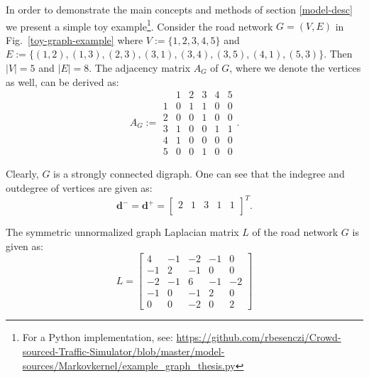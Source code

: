 \documentclass[b5paper,12pt]{report}
\theoremstyle{definition}
\newcommand{\bd}{\boldsymbol{d}}
\begin{document}
In order to demonstrate the main concepts and methods of section \ref{model-desc} we present a simple toy example\footnote{For a Python implementation, see: \url{https://github.com/rbesenczi/Crowd-sourced-Traffic-Simulator/blob/master/model-sources/Markovkernel/example_graph_thesis.py}}. Consider the road network $G=(V,E)$ in Fig.~\ref{toy-graph-example} where $V := \{1, 2, 3, 4, 5\}$ and \\$E := \{(1, 2), (1, 3), (2, 3), (3, 1), (3, 4), (3, 5), (4, 1), (5, 3)\}$. Then $|V| = 5$ and $|E| = 8$. The adjacency matrix $A_G$ of $G$, where we denote the vertices as well, can be derived as:
\[ A_G := \begin{array}{c|ccccc}
 & 1 & 2 & 3 & 4 & 5 \\
 \hline
1 & 0 & 1 & 1 & 0 & 0 \\
2 & 0 & 0 & 1 & 0 & 0 \\
3 & 1 & 0 & 0 & 1 & 1 \\
4 & 1 & 0 & 0 & 0 & 0 \\
5 & 0 & 0 & 1 & 0 & 0
\end{array}.\] 

Clearly, $G$ is a strongly connected digraph. One can see that the indegree and outdegree of vertices are given as:
\[ 
\bd^{−} = \bd^{+} = \left[ \begin{array}{ccccc}
2 & 1 & 3 & 1 & 1 \\
\end{array} \right]^T. 
\]

The symmetric unnormalized graph Laplacian matrix $L$ of the road network $G$ is given as:
\begin{equation*}
L = \begin{bmatrix} 4 & -1 & -2 & -1 & 0 \\  
     -1 & 2 &-1 & 0 & 0 \\ 
     -2 &-1 & 6 &-1 & -2 \\
    -1 & 0 &-1 & 2 & 0 \\
     0 & 0 & -2 & 0 & 2 \end{bmatrix}
\end{equation*}
\end{document}
